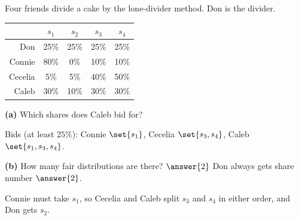 \documentclass[12pt]{ximera}
\begin{document}
\begin{problem}
Four friends divide a cake by the lone-divider method. Don is the divider.
\begin{center}
\begin{tabular}{r|cccc}
 & $s_1$ & $s_2$ & $s_3$ & $s_4$\\\hline
Don & 25\% & 25\% & 25\% & 25\%\\
Connie & 80\% & 0\% & 10\% & 10\%\\
Cecelia & 5\% & 5\% & 40\% & 50\%\\
Caleb & 30\% & 10\% & 30\% & 30\%
\end{tabular}
\end{center}

\begin{prompt}
\textbf{(a)} Which shares does Caleb bid for?
\begin{selectAll}
\end{selectAll}
\begin{feedback}
Bids (at least $25\%$): Connie $\set{s_1}$, Cecelia $\set{s_3,s_4}$, Caleb
$\set{s_1,s_3,s_4}$.
\end{feedback}
\end{prompt}

\begin{prompt}
\textbf{(b)} How many fair distributions are there? $\answer{2}$ \qquad Don always gets
share number $\answer{2}$.
\begin{feedback}
Connie must take $s_1$, so Cecelia and Caleb split $s_3$ and $s_4$ in either order, and
Don gets $s_2$.
\end{feedback}
\end{prompt}
\end{problem}
\end{document}

